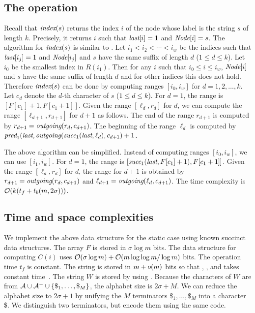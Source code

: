 \subsection{The {\search} operation}
Recall that ${\textit{index}}(s)$ returns the index $i$ of the node whose label 
is the string $s$ of length $k$.
Precisely, it returns $i$ such that ${\textit{last}}[i] = 1$ and ${\textit{Node}}[i] = s$.
The algorithm for ${\textit{index}}(s)$ is similar to \cite{FerMan05}.
Let $i_1 < i_2 < \cdots < i_w$ be the indices such that
${\textit{last}}[i_j] = 1$ and ${\textit{Node}}[i_j]$ and $s$ have the same suffix of length $d$ ($1 \le d \le k$).
Let $i_0$ be the smallest index in $R(i_1)$.
Then for any $i$ such that $i_0 \le i \le i_w$, ${\textit{Node}}[i]$ and $s$ have the same suffix of length $d$
and for other indices this does not hold.
Therefore ${\textit{index}}(s)$ can be done by computing 
ranges $[i_0, i_w]$ for $d = 1,2,\ldots,k$.
Let $c_d$ denote the $d$-th character of $s$ ($1 \le d \le k$).
For $d=1$, the range is $[F[c_1]+1, F[c_1+1]]$.
Given the range $[\ell_d, r_d]$ for $d$,  we can compute the range $[\ell_{d+1}, r_{d+1}]$ for $d+1$
as follows.  The end of the range $r_{d+1}$ is computed by $r_{d+1} = {\textit{outgoing}}(r_d, c_{d+1})$.
The beginning of the range $\ell_d$ is computed by ${\textit{pred}}_1({\textit{last}},{\textit{outgoing}}({\textit{succ}}_1({\textit{last}}, \ell_d), c_{d+1})+1$.

The above algorithm can be simplified.  Instead of computing ranges $[i_0, i_w]$,
we can use $[i_1, i_w]$.  For $d=1$, the range is $[{\textit{succ}}_1({\textit{last}},F[c_1]+1), F[c_1+1]]$.
Given the range $[\ell_d, r_d]$ for $d$, the range for $d+1$ is obtained by
$r_{d+1} = {\textit{outgoing}}(r_d, c_{d+1})$ and $\ell_{d+1} = {\textit{outgoing}}(\ell_d, c_{d+1})$.
The time complexity is $\mathcal{O}(k(t_f + t_b(m,2\sigma)))$.

\subsection{Time and space complexities}
We implement the above data structure for the static case using known succinct data structures.
The array $F$ is stored in $\sigma \log m$ bits.  The data structure for computing $C(i)$
uses $\mathcal{O}(\sigma \log m) + \mathcal{O}(m \log \log m/\log m)$ bits.  The operation time $t_f$ is constant.
The string {\last} is stored in $m+o(m)$ bits so that {\rank}, {\select}, and {\access} takes constant 
time~\cite{RRR07}.  The string $W$ is stored by using \cite{FerManMakNav06}.  
Because the characters
of $W$ are from ${\cal A} \cup {\cal A}^- \cup \{\$_1,\ldots,\$_M\}$, 
the alphabet size is $2\sigma + M$.
%
We can reduce the alphabet size to $2\sigma+1$ by unifying the $M$ terminators
$\$_1,\ldots,\$_M$ into a character \$.  We distinguish two terminators, but
encode them using the same code.

